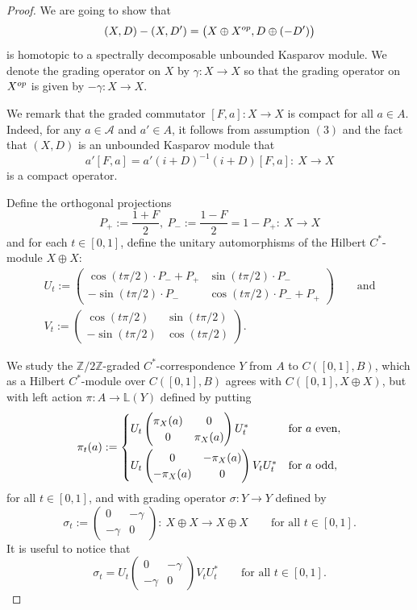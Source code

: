 \documentclass[11pt]{article}
\numberwithin{equation}{section}
\newcommand{\cd}{\cdot}
\newcommand{\op}{\oplus}
\newcommand{\zz}{\mathbb{Z}}
\newcommand{\ga}{\gamma}
\newcommand{\si}{\sigma}
\newcommand{\s}[1]{\mathscr{#1}}
\newcommand{\B}[1]{\mathbb{#1}}
\begin{document}
\begin{proof}
We are going to show that
\[
(X,D) - (X, D') = \big(X \op X^{{\rm op}}, D \op (- D') \big)
\]
is homotopic to a spectrally decomposable unbounded Kasparov module. We denote the grading operator on $X$ by $\ga\colon X \to X$ so that the grading operator on $X^{{\rm op}}$ is given by $-\ga\colon X \to X$.

We remark that the graded commutator $[F,a]\colon X \to X$ is compact for all $a \in A$. Indeed, for any $a \in \s A$ and $a' \in A$, it follows from assumption $(3)$ and the fact that $(X,D)$ is an unbounded Kasparov module that
\[
a' [F,a] = a' (i + D)^{-1} (i + D) [F,a]\colon \ X \to X
\]
is a compact operator.

Define the orthogonal projections
\[
P_+ := \frac{1 + F}{2} , \ P_- := \frac{1 - F}{2} = 1 - P_+\colon \ X \to X
\]
and for each $t \in [0,1]$, define the unitary automorphisms of the Hilbert $C^*$-module $X \op X$:
\begin{gather}
U_t := \left(\begin{matrix} \cos(t \pi/ 2) \cd P_- + P_+ & \sin(t \pi/2) \cd P_- \\ - \sin(t \pi/2) \cd P_- & \cos(t \pi/2) \cd P_- + P_+\end{matrix}\right) \qquad \text{and} \nonumber\\
V_t := \left(\begin{matrix} \cos(t \pi/ 2) & \sin(t \pi/2) \\ - \sin(t \pi/2) & \cos(t \pi/2) \end{matrix}\right) .\label{eq:unitary}
\end{gather}

We study the $\zz/2\zz$-graded $C^*$-correspondence $Y$ from $A$ to $C([0,1],B)$, which as a Hilbert $C^*$-module over $C([0,1],B)$ agrees with $C( [0,1],X \op X)$, but with left action $\pi\colon A \to \B L(Y)$ defined by putting
\[
\pi_t(a) := \begin{cases} U_t \left(\begin{matrix}\pi_X(a) & 0 \\ 0 & \pi_X(a)\end{matrix}\right) U_t^* & \text{for} \ a \text{ even}, \vspace{1mm}\\
U_t \left(\begin{matrix}0 & -\pi_X(a) \\ -\pi_X(a) & 0\end{matrix}\right) V_t U_t^*
& \text{for} \ a \text{ odd} ,\end{cases}
\]
for all $t \in [0,1]$, and with grading operator $\si\colon Y \to Y$ defined by
\[
\si_t := \left(\begin{matrix} 0 & - \ga \\ - \ga & 0\end{matrix}\right) \colon \ X \op X \to X \op X \qquad \text{for all } t \in [0,1] .
\]
It is useful to notice that
\[
\si_t = U_t \left(\begin{matrix} 0 & - \ga \\ -\ga & 0\end{matrix}\right) V_t U_t^* \qquad \text{for all } t \in [0,1] .
\]


\end{proof}
\end{document}
